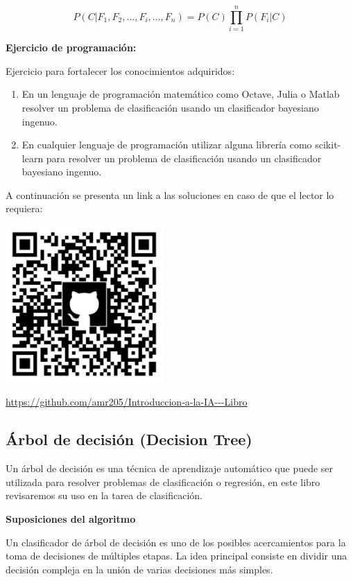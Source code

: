\documentclass[11pt,fleqn]{book} %
\begin{document}
\begin{equation}
P(C|F_{1},F_{2},...,F_{i},...,F_{n}) = P(C) \prod_{i=1}^n P(F_i \vert C)
\label{eqn:clasificadorBayesianoFinal2} 
\end{equation}

\textbf{Ejercicio de programación:}

Ejercicio para fortalecer los conocimientos adquiridos:

\begin{enumerate}
\item En un lenguaje de programación matemático como Octave, Julia o Matlab resolver un problema de clasificación usando un clasificador bayesiano ingenuo.
\item En cualquier lenguaje de programación utilizar alguna librería como scikit-learn para resolver un problema de clasificación usando un clasificador bayesiano ingenuo.
\end{enumerate}

A continuación se presenta un link a las soluciones en caso de que el lector lo requiera:

\includegraphics[width=6cm]{Pictures/github/libro-ia.png}

\url{https://github.com/amr205/Introduccion-a-la-IA---Libro}

\subsection{Árbol de decisión (Decision Tree)} 

Un árbol de decisión es una técnica de aprendizaje automático que puede ser utilizada para resolver problemas de clasificación o regresión, en este libro revisaremos su uso en la tarea de clasificación.

\textbf{Suposiciones del algoritmo}

Un clasificador de árbol de decisión es uno de los posibles acercamientos para la toma de decisiones de múltiples etapas. La idea principal consiste en dividir una decisión compleja en la unión de varias decisiones más simples. \cite{dtc_survey}
\end{document}
